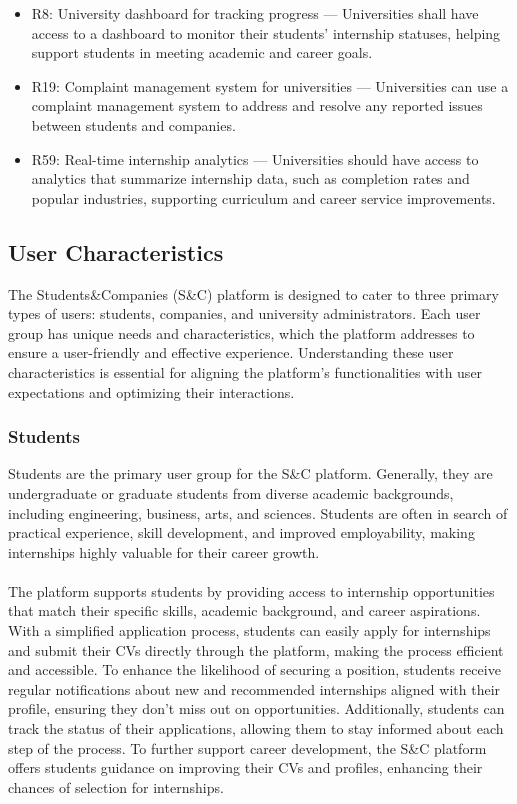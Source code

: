     \begin{itemize}
        \item R8: University dashboard for tracking progress — Universities shall have access to a dashboard to monitor their students' internship statuses, helping support students in meeting academic and career goals.
        \item R19: Complaint management system for universities — Universities can use a complaint management system to address and resolve any reported issues between students and companies.
        \item R59: Real-time internship analytics — Universities should have access to analytics that summarize internship data, such as completion rates and popular industries, supporting curriculum and career service improvements.
    \end{itemize}




\subsection{User Characteristics}

The Students\&Companies (S\&C) platform is designed to cater to three primary types of users: students, companies, and university administrators. Each user group has unique needs and characteristics, which the platform addresses to ensure a user-friendly and effective experience. Understanding these user characteristics is essential for aligning the platform’s functionalities with user expectations and optimizing their interactions.

\subsubsection{Students}
Students are the primary user group for the S\&C platform. Generally, they are undergraduate or graduate students from diverse academic backgrounds, including engineering, business, arts, and sciences. Students are often in search of practical experience, skill development, and improved employability, making internships highly valuable for their career growth. \\ \\
The platform supports students by providing access to internship opportunities that match their specific skills, academic background, and career aspirations. With a simplified application process, students can easily apply for internships and submit their CVs directly through the platform, making the process efficient and accessible. To enhance the likelihood of securing a position, students receive regular notifications about new and recommended internships aligned with their profile, ensuring they don’t miss out on opportunities. Additionally, students can track the status of their applications, allowing them to stay informed about each step of the process. To further support career development, the S\&C platform offers students guidance on improving their CVs and profiles, enhancing their chances of selection for internships.

